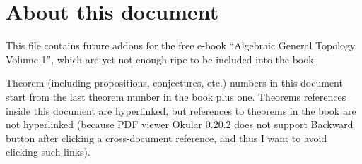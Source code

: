 \documentclass[a4paper,oneside,english,reqno]{amsbook}
\begin{document}
\tableofcontents{}

\chapter{About this document}

This file contains future addons for the free e-book ``Algebraic General
Topology. Volume 1'', which are yet not enough ripe to be included into the
book.

Theorem (including propositions, conjectures, etc.) numbers in this document start from the last theorem number
in the book plus one. Theorems references inside this document are hyperlinked, but references
to theorems in the book are not hyperlinked (because PDF viewer Okular 0.20.2 does not support
Backward button after clicking a cross-document reference, and thus I want to avoid clicking such links).





















\end{document}
